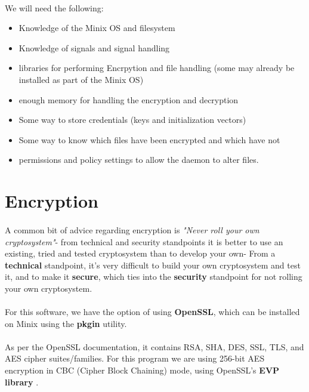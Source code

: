 \documentclass{article}
\begin{document}
    \paragraph{}We will need the following:
    \begin{itemize}
        \item Knowledge of the Minix OS and filesystem
        \item Knowledge of signals and signal handling
        \item libraries for performing Encrpytion and file handling (some may already be installed as part of the Minix OS)
        \item enough memory for handling the encryption and decryption
        \item Some way to store credentials (keys and initialization vectors)
        \item Some way to know which files have been encrypted and which have not
        \item permissions and policy settings to allow the daemon to alter files.
    \end{itemize}

\section{Encryption}
    \paragraph{}A common bit of advice regarding encryption is \textit{"Never roll your own cryptosystem"}- from technical and security standpoints it is better to use an existing, tried and tested cryptosystem than to develop your own- From a \textbf{technical} standpoint, it's very difficult to build your own cryptosystem and test it, and to make it \textbf{secure}, which ties into the \textbf{security} standpoint for not rolling your own cryptosystem.
    
    \paragraph{}For this software, we have the option of using \textbf{OpenSSL}, which can be installed on Minix using the \textbf{pkgin} utility.
    
    \paragraph{}As per the OpenSSL documentation, it contains RSA, SHA, DES, SSL, TLS, and AES cipher suites/families. For this program we are using 256-bit AES encryption in CBC (Cipher Block Chaining) mode, using OpenSSL's \textbf{EVP library} \parencite{openssl_evp}.
\end{document}
